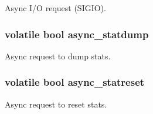 Async I/O request (SIGIO). \hypertarget{async_8hh_aefaca48e0adec29337fb2900291759ea}{
\subsubsection[{async\_\-statdump}]{\setlength{\rightskip}{0pt plus 5cm}volatile bool {\bf async\_\-statdump}}}
\label{async_8hh_aefaca48e0adec29337fb2900291759ea}


Async request to dump stats. \hypertarget{async_8hh_af604aa1dbffb0b9ac7a175595de2dc90}{
\subsubsection[{async\_\-statreset}]{\setlength{\rightskip}{0pt plus 5cm}volatile bool {\bf async\_\-statreset}}}
\label{async_8hh_af604aa1dbffb0b9ac7a175595de2dc90}


Async request to reset stats. 